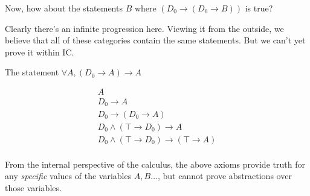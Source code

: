 \documentclass{article}
\begin{document}
  Now, how about the statements $B$ where $(D_0 \to (D_0 \to B))$ is true?
  
  Clearly there's an infinite progression here. Viewing it from the outside, we believe that all of these categories contain the same statements. But we can't yet prove it within IC.
  
  The statement $\forall A, (D_0 \to A) \to A$
  
  \begin{align*}
    A\\
    D_0 \to A\\
    D_0 \to (D_0 \to A)\\
    D_0 \wedge (\top \to D_0) \to A\\
    D_0 \wedge (\top \to D_0) \to (\top \to A)\\
  \end{align*}




  \newcommand{\ic}[1]{#1}


  From the internal perspective of the calculus, the above axioms provide truth for any \emph{specific} values of the variables $A, B\dots$, but cannot prove abstractions over those variables.

\fi

\iffalse
  \subsection{Well-founded sets}

  Some discussion of well-founded sets, and how they avoid the Burali-Forti paradox.

  By convention, a \emph{set} is a predicate on formulas, where if $PF$ is true, then $F \in P$. One might expect this to cause paradoxes; this section will illustrate how it does not.

  We define \emph{well-founded sets} with a surprisingly simple rule: A well-founded set is a set for which all \emph{raisable predicates} are true. And a \emph{raisable predicate} $R$ is one where, if the $R$ is true for all members of a set, then $R$ is also true for the set itself:

  \ic{
  Raisable := R => (Q => (x => (Q x) -> (R x)) -> (R Q)).
  WellFounded := S => R => (Raisable R) -> (R S).
  }

  The first well-founded set is the empty set, which we can prove is well-founded:
  
%
%
%
%


  \fi

\end{document}
